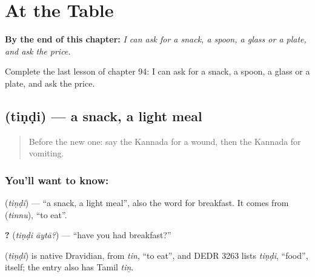 
\chapter{At the Table}
\label{ch:ka-at-the-table}

\begin{chapteropening}
\textbf{By the end of this chapter:} \emph{I can ask for a snack, a spoon, a glass or a plate, and ask the price.}

Complete the last lesson of chapter 94: I can ask for a snack, a spoon, a glass or a plate, and ask the price.
\end{chapteropening}

\section[\texorpdfstring{\kn{ತಿಂಡಿ} (tiṇḍi)}{ತಿಂಡಿ (tiṇḍi)}]{ (tiṇḍi) — a snack, a light meal}

\label{lesson:KA-C94-snack}



\begin{quote}
Before the new one: say the Kannada for a wound, then the Kannada for vomiting.
\end{quote}

\subsection*{You'll want to know: }
\textbf{} (\emph{tiṇḍi}) — \textquotedblleft{}a snack, a light meal\textquotedblright{}, also the word for breakfast. It comes from \textbf{} (\emph{tinnu}), \textquotedblleft{}to eat\textquotedblright{}.

\textbf{ ?} (\emph{tiṇḍi āytā?}) — \textquotedblleft{}have you had breakfast?\textquotedblright{}

\begin{cousinweb}
\textbf{} (\emph{tiṇḍi}) is native Dravidian, from \emph{tin}, \textquotedblleft{}to eat\textquotedblright{}, and DEDR 3263 lists \emph{tiṇḍi}, \textquotedblleft{}food\textquotedblright{}, itself; the entry also has Tamil \emph{tiṉ}.
\end{cousinweb}


